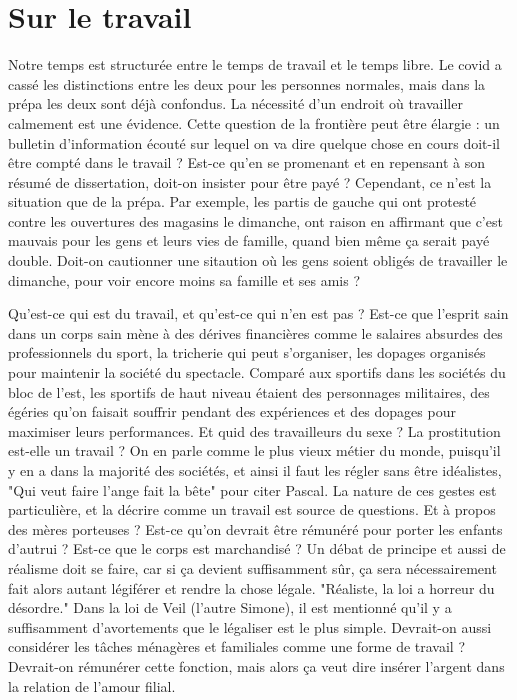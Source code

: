 \documentclass[a4paper,12pt]{book}
\begin{document}
\section{Sur le travail}
\par Notre temps est structurée entre le temps de travail et le temps libre. Le covid a cassé les distinctions entre les deux pour les personnes normales, mais dans la prépa les deux sont déjà confondus. La nécessité d'un endroit où travailler calmement est une évidence. Cette question de la frontière peut être élargie : un bulletin d'information écouté sur lequel on va dire quelque chose en cours doit-il être compté dans le travail ? Est-ce qu'en se promenant et en repensant à son résumé de dissertation, doit-on insister pour être payé ? Cependant, ce n'est la situation que de la prépa. Par exemple, les partis de gauche qui ont protesté contre les ouvertures des magasins le dimanche, ont raison en affirmant que c'est mauvais pour les gens et leurs vies de famille, quand bien même ça serait payé double. Doit-on cautionner une sitaution où les gens soient obligés de travailler le dimanche, pour voir encore moins sa famille et ses amis ?
\par Qu'est-ce qui est du travail, et qu'est-ce qui n'en est pas ? Est-ce que l'esprit sain dans un corps sain mène à des dérives financières comme le salaires absurdes des professionnels du sport, la tricherie qui peut s'organiser, les dopages organisés pour maintenir la société du spectacle. Comparé aux sportifs dans les sociétés du bloc de l'est, les sportifs de haut niveau étaient des personnages militaires, des égéries qu'on faisait souffrir pendant des expériences et des dopages pour maximiser leurs performances. Et quid des travailleurs du sexe ? La prostitution est-elle un travail ? On en parle comme le plus vieux métier du monde, puisqu'il y en a dans la majorité des sociétés, et ainsi il faut les régler sans être idéalistes, "Qui veut faire l'ange fait la bête" pour citer Pascal. La nature de ces gestes est particulière, et la décrire comme un travail est source de questions. Et à propos des mères porteuses ? Est-ce qu'on devrait être rémunéré pour porter les enfants d'autrui ? Est-ce que le corps est marchandisé ? Un débat de principe et aussi de réalisme doit se faire, car si ça devient suffisamment sûr, ça sera nécessairement fait alors autant légiférer et rendre la chose légale. "Réaliste, la loi a horreur du désordre." Dans la loi de Veil (l'autre Simone), il est mentionné qu'il y a suffisamment d'avortements que le légaliser est le plus simple. Devrait-on aussi considérer les tâches ménagères et familiales comme une forme de travail ? Devrait-on rémunérer cette fonction, mais alors ça veut dire insérer l'argent dans la relation de l'amour filial.
\end{document}
